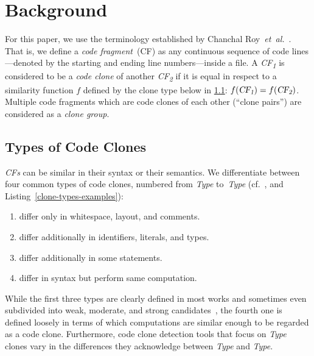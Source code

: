 \documentclass[10pt,journal,compsoc]{IEEEtran}
\def\T#1{\textsl{Type\nobreakdash-#1}}
\begin{document}
\section{Background}\label{sec:Background}
For this paper, we use the terminology established by Chanchal Roy~\textsl{et~al.}~\cite{roy2009comparison}.
That is, we define a \textit{code fragment}~(CF) as any continuous sequence of code lines---denoted by the starting and ending line numbers---inside a file.
A \textsl{CF\textsubscript1} is considered to be a \textit{code clone} of another \textsl{CF\textsubscript2} if it is equal in respect to a similarity function \(f\) defined by the clone type below in \cref{code-clone-types}: \(f(\text{\textsl{CF\textsubscript1}}) = f(\text{\textsl{CF\textsubscript2}})\). Multiple code fragments which are code clones of each other (\enquote{clone pairs}) are considered as a \textit{clone group}.

\subsection{Types of Code Clones}\label{code-clone-types}
\textsl{CFs} can be similar in their syntax or their semantics.
We differentiate between four common types of code clones, numbered from \T1 to~\T4 (cf.~\cite{roy2009comparison,10.1145/3381307.3381310}, and Listing~\ref{clone-types-examples}):
\begin{enumerate}
  \item differ only in whitespace, layout, and comments.
  \item differ additionally in identifiers, literals, and types.
  \item differ additionally in some statements.
  \item differ in syntax but perform same computation.
\end{enumerate}
While the first three types are clearly defined in most works and sometimes even subdivided into weak, moderate, and strong candidates~\cite{svajlenko2014towards}, the fourth one is defined loosely in terms of which computations are similar enough to be regarded as a code clone. Furthermore, code clone detection tools that focus on \T4 clones vary in the differences they acknowledge between \T3 and \T4. %
\end{document}
